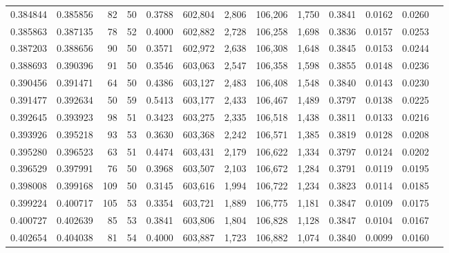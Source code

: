 \begin{tabular}{rrrrrrrrrrrrr}
0.384844 & 0.385856 &    82 &  50 &                                     0.3788 & 602,804 &   2,806 & 106,206 &   1,750 & 0.3841 & 0.0162 & 0.0260 \\
0.385863 & 0.387135 &    78 &  52 &                                     0.4000 & 602,882 &   2,728 & 106,258 &   1,698 & 0.3836 & 0.0157 & 0.0253 \\
0.387203 & 0.388656 &    90 &  50 &                                     0.3571 & 602,972 &   2,638 & 106,308 &   1,648 & 0.3845 & 0.0153 & 0.0244 \\
0.388693 & 0.390396 &    91 &  50 &                                     0.3546 & 603,063 &   2,547 & 106,358 &   1,598 & 0.3855 & 0.0148 & 0.0236 \\
0.390456 & 0.391471 &    64 &  50 &                                     0.4386 & 603,127 &   2,483 & 106,408 &   1,548 & 0.3840 & 0.0143 & 0.0230 \\
0.391477 & 0.392634 &    50 &  59 &                                     0.5413 & 603,177 &   2,433 & 106,467 &   1,489 & 0.3797 & 0.0138 & 0.0225 \\
0.392645 & 0.393923 &    98 &  51 &                                     0.3423 & 603,275 &   2,335 & 106,518 &   1,438 & 0.3811 & 0.0133 & 0.0216 \\
0.393926 & 0.395218 &    93 &  53 &                                     0.3630 & 603,368 &   2,242 & 106,571 &   1,385 & 0.3819 & 0.0128 & 0.0208 \\
0.395280 & 0.396523 &    63 &  51 &                                     0.4474 & 603,431 &   2,179 & 106,622 &   1,334 & 0.3797 & 0.0124 & 0.0202 \\
0.396529 & 0.397991 &    76 &  50 &                                     0.3968 & 603,507 &   2,103 & 106,672 &   1,284 & 0.3791 & 0.0119 & 0.0195 \\
0.398008 & 0.399168 &   109 &  50 &                                     0.3145 & 603,616 &   1,994 & 106,722 &   1,234 & 0.3823 & 0.0114 & 0.0185 \\
0.399224 & 0.400717 &   105 &  53 &                                     0.3354 & 603,721 &   1,889 & 106,775 &   1,181 & 0.3847 & 0.0109 & 0.0175 \\
0.400727 & 0.402639 &    85 &  53 &                                     0.3841 & 603,806 &   1,804 & 106,828 &   1,128 & 0.3847 & 0.0104 & 0.0167 \\
0.402654 & 0.404038 &    81 &  54 &                                     0.4000 & 603,887 &   1,723 & 106,882 &   1,074 & 0.3840 & 0.0099 & 0.0160 \\

\end{tabular}
